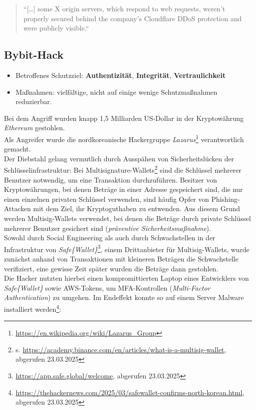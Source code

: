 \blockquote[]{
    ``[\ldots] some X origin servers, which respond to web requests, weren't properly secured behind the company's Cloudflare DDoS protection and were publicly visible.``
}

\subsection*{Bybit-Hack}

\begin{itemize}
    \itemsep0.5em
    \item Betroffenes Schutzziel: \textbf{Authentizität}, \textbf{Integrität}, \textbf{Vertraulichkeit}
    \item Maßnahmen: vielfältige, nicht auf einige wenige Schutzmaßnahmen reduzierbar.
\end{itemize}

\noindent
Bei dem Angriff wurden knapp 1,5 Milliarden US-Dollar in der Kryptowährung \textit{Ethereum} gestohlen.\\
Als Angreifer wurde die nordkoreanische Hackergruppe \textit{Lazarus}\footnote{
    \url{https://en.wikipedia.org/wiki/Lazarus_Group}
} verantwortlich gemacht.\\

\noindent
Der Diebstahl gelang vermutlich durch Ausspähen von Sicherheitslücken der Schlüsselinfrastruktur: Bei Multisignature-Wallets\footnote{
    s. \url{https://academy.binance.com/en/articles/what-is-a-multisig-wallet}, abgerufen 23.03.2025
} sind die Schlüssel mehrerer Benutzer notwendig, um eine Transaktion durchzuführen.
Besitzer von Kryptowährungen, bei denen Beträge in einer Adresse gespeichert sind, die nur einen einzelnen privaten Schlüssel verwenden, sind häufig Opfer von Phishing-Attacken mit dem Ziel, ihr Kryptoguthaben zu entwenden.
Aus diesem Grund werden Multisig-Wallets verwendet, bei denen die Beträge durch private Schlüssel mehrerer Benutzer gesichert sind (\textit{präventive Sicherheitsmaßnahme}).\\
Sowohl durch Social Engineering als auch durch Schwachstellen in der Infrastruktur von \textit{Safe\{Wallet\}}\footnote{
    \url{https://app.safe.global/welcome}, abgerufen 23.03.2025
}, einem Drittanbieter für Multisig-Wallets, wurde zunächst anhand von Transaktionen mit kleineren Beträgen die Schwachstelle verifiziert, eine gewisse Zeit später wurden die Beträge dann gestohlen.\\
Die Hacker nutzten hierbei einen kompromittierten Laptop eines Entwicklers von \textit{Safe\{Wallet\}} sowie AWS-Tokens, um MFA-Kontrollen (\textit{Multi-Factor Authentication}) zu umgehen.
Im Endeffekt konnte so auf einem Server Malware installiert werden\footnote{
    \url{https://thehackernews.com/2025/03/safewallet-confirms-north-korean.html}, abgerufen 23.03.2025
}:

